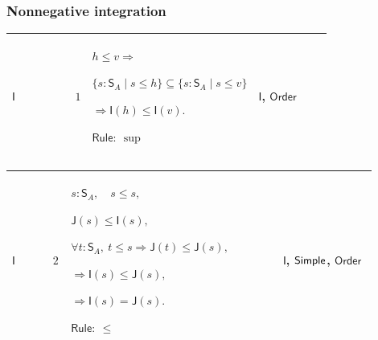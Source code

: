\documentclass[12pt,reqno]{amsart}
\theoremstyle{blueplain}
\numberwithin{equation}{section}
\newlength{\DCTOneColumnBody}
\begin{document}
\subsubsection{\protect\scriptsize Nonnegative integration}

{\scriptsize \setlength{\parskip}{0pt}\nointerlineskip
\noindent 
\begin{tabular}{|@{}>{\centering\arraybackslash}m{\DCTOneColumnBody}|}
\hline
$\displaystyle \mathsf{Context\_I}:=$\par$\displaystyle h,v:\mathsf{F}.$ \\ 
\hline
\end{tabular}%
}

{\scriptsize \setlength{\parskip}{0pt}\nointerlineskip
\noindent 
\begin{tabular}{|@{}>{\centering\arraybackslash}m{0.10658\linewidth}|>{\centering\arraybackslash}m{0.03553\linewidth}|>{\centering\arraybackslash}m{0.52105\linewidth}|>{\centering\arraybackslash}m{0.23684\linewidth}|}
\hline
\hypertarget{proof:I1}{$\displaystyle \mathsf{I}$} & $\displaystyle 1$ & $%
\displaystyle h\le v\Rightarrow$\par$\displaystyle \{s:\mathsf{S}_A\mid s\le
h\}\subseteq\{s:\mathsf{S}_A\mid s\le v\}$\par$\displaystyle \Rightarrow%
\mathsf{I}(h)\le\mathsf{I}(v).$\par$\displaystyle \mathsf{Rule}:\ \sup$ & 
\hyperlink{def:I}{$\displaystyle \mathsf{I}$}, \hyperlink{ax:Order}{$%
\displaystyle \mathsf{Order}$} \\ \hline
\end{tabular}%
}

{\scriptsize \setlength{\parskip}{0pt}\nointerlineskip
\noindent 
\begin{tabular}{|@{}>{\centering\arraybackslash}m{0.10658\linewidth}|>{\centering\arraybackslash}m{0.03553\linewidth}|>{\centering\arraybackslash}m{0.52105\linewidth}|>{\centering\arraybackslash}m{0.23684\linewidth}|}
\hline
\hypertarget{proof:I2}{$\displaystyle \mathsf{I}$} & $\displaystyle 2$ & $%
\displaystyle s:\mathsf{S}_A,\quad s\le s,$\par$\displaystyle \mathsf{J}%
(s)\le\mathsf{I}(s),$\par$\displaystyle \forall t:\mathsf{S}_A,\ t\le
s\Rightarrow\mathsf{J}(t)\le\mathsf{J}(s),$\par$\displaystyle \Rightarrow%
\mathsf{I}(s)\le\mathsf{J}(s),$\par$\displaystyle \Rightarrow\mathsf{I}(s)=%
\mathsf{J}(s).$\par$\displaystyle \mathsf{Rule}:\ \le$ & \hyperlink{def:I}{$%
\displaystyle \mathsf{I}$}, \hyperlink{lem:Simple}{$\displaystyle \mathsf{%
Simple}$}, \hyperlink{ax:Order}{$\displaystyle \mathsf{Order}$} \\ \hline
\end{tabular}%
}
\end{document}
